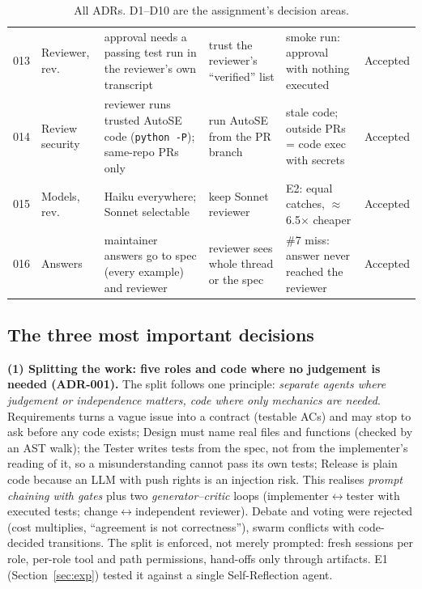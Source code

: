 \documentclass[10pt,a4paper]{article}
\newcommand{\adr}[1]{ADR-#1}
\begin{document}
\begin{table}[h]
\begin{tabularx}{\linewidth}{@{}l p{2.3cm} Y p{3.0cm} Y l@{}}
013 & Reviewer, rev. & approval needs a passing test run in the reviewer's own transcript & trust the reviewer's ``verified'' list & smoke run: approval with nothing executed & Accepted\\
014 & Review security & reviewer runs trusted AutoSE code (\texttt{python -P}); same-repo PRs only & run AutoSE from the PR branch & stale code; outside PRs = code exec with secrets & Accepted\\
015 & Models, rev. & Haiku everywhere; Sonnet selectable & keep Sonnet reviewer & E2: equal catches, $\approx$6.5$\times$ cheaper & Accepted\\
016 & Answers & maintainer answers go to spec (every example) and reviewer & reviewer sees whole thread or the spec & \#7 miss: answer never reached the reviewer & Accepted\\
\bottomrule
\end{tabularx}
\caption{All ADRs. D1--D10 are the assignment's decision areas.}
\label{tab:adrs}
\end{table}

\subsection*{The three most important decisions}
\textbf{(1) Splitting the work: five roles and code where no judgement is needed (\adr{001}).} The split follows one
principle: \emph{separate agents where judgement or independence matters, code where only mechanics are needed}.
Requirements turns a vague issue into a contract (testable ACs) and may stop to ask before any code exists; Design must
name real files and functions (checked by an AST walk); the Tester writes tests from the spec, not from the implementer's
reading of it, so a misunderstanding cannot pass its own tests; Release is plain code because an LLM with push rights is
an injection risk. This realises \emph{prompt chaining with gates} plus two \emph{generator--critic} loops
(implementer$\leftrightarrow$tester with executed tests; change$\leftrightarrow$independent reviewer). Debate and voting
were rejected (cost multiplies, ``agreement is not correctness''), swarm conflicts with code-decided transitions. The split
is enforced, not merely prompted: fresh sessions per role, per-role tool and path permissions, hand-offs only through
artifacts. E1 (Section~\ref{sec:exp}) tested it against a single Self-Reflection agent.
\end{document}
